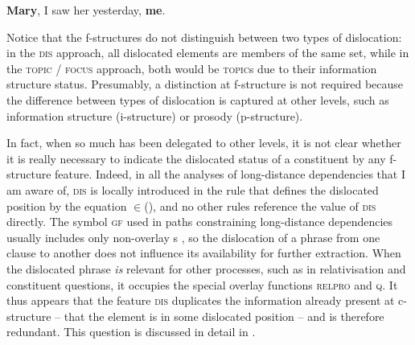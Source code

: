 \documentclass[output=paper]{../langscibook}
\begin{document}
 \newpage
 \ea\label{ex:gfs:mary}
 \ea \textbf{Mary}, I saw her yesterday, \textbf{me}.
 
 \ex
 \z
 \z
 
 \noindent Notice that the f-structures do not distinguish between two types of dislocation: in the \textsc{dis} approach, all dislocated elements are members of the same set, while in the \textsc{topic} / \textsc{focus} approach, both would be \textsc{topic}s due to their information structure status. Presumably, a distinction at f-structure is not required because the difference between types of dislocation is captured at other levels, such as information structure (i-structure) or prosody (p-structure).
 
 In fact, when so much has been delegated to other levels, it is not clear whether it is really necessary to indicate the dislocated status of a constituent by any f-structure feature. Indeed, in all the analyses of long-distance dependencies that I am aware of, \textsc{dis} is locally introduced in the rule that defines the dislocated position by the equation \DOWN$\in$\:(\UP\DIS), and no other rules reference the value of \textsc{dis} directly. The symbol \textsc{gf} used in paths constraining long-distance dependencies usually includes only non-overlay {\GF}s \citep[206]{DLM:LFG}, so the dislocation of a phrase from one clause to another does not influence its availability for further extraction. When the dislocated phrase \textit{is} relevant for other processes, such as in relativisation and constituent questions, it occupies the special overlay functions \textsc{relpro} and \textsc{q}. It thus appears that the feature \textsc{dis} duplicates the information already present at c-structure -- that the element is in some dislocated position -- and is therefore redundant.  This question is discussed in detail in \citet[section~4.6]{Snijders2015}.
 
\end{document}
